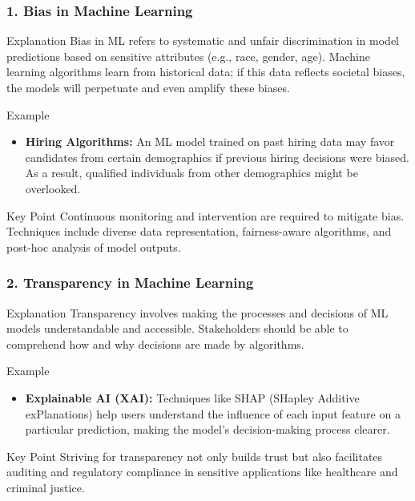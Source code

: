 \documentclass[aspectratio=169]{beamer}
\begin{document}
\begin{frame}[fragile]
    \frametitle{1. Bias in Machine Learning}
    \begin{block}{Explanation}
        Bias in ML refers to systematic and unfair discrimination in model predictions based on sensitive attributes (e.g., race, gender, age). Machine learning algorithms learn from historical data; if this data reflects societal biases, the models will perpetuate and even amplify these biases.
    \end{block}
    
    \begin{block}{Example}
        \begin{itemize}
            \item \textbf{Hiring Algorithms:} An ML model trained on past hiring data may favor candidates from certain demographics if previous hiring decisions were biased. As a result, qualified individuals from other demographics might be overlooked.
        \end{itemize}
    \end{block}
    
    \begin{block}{Key Point}
        Continuous monitoring and intervention are required to mitigate bias. Techniques include diverse data representation, fairness-aware algorithms, and post-hoc analysis of model outputs.
    \end{block}
\end{frame}

\begin{frame}[fragile]
    \frametitle{2. Transparency in Machine Learning}
    \begin{block}{Explanation}
        Transparency involves making the processes and decisions of ML models understandable and accessible. Stakeholders should be able to comprehend how and why decisions are made by algorithms.
    \end{block}
    
    \begin{block}{Example}
        \begin{itemize}
            \item \textbf{Explainable AI (XAI):} Techniques like SHAP (SHapley Additive exPlanations) help users understand the influence of each input feature on a particular prediction, making the model’s decision-making process clearer.
        \end{itemize}
    \end{block}

    \begin{block}{Key Point}
        Striving for transparency not only builds trust but also facilitates auditing and regulatory compliance in sensitive applications like healthcare and criminal justice.
    \end{block}
\end{frame}
\end{document}
